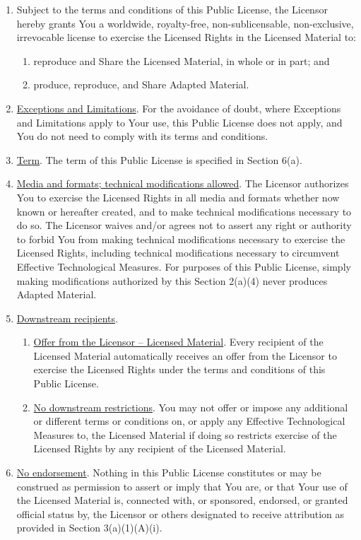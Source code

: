 \documentclass[a4paper, 12pt]{article}
\begin{document}
\begin{enumerate}
\item Subject to the terms and conditions of this Public License, the Licensor hereby grants You a worldwide, royalty-free, non-sublicensable, non-exclusive, irrevocable license to exercise the Licensed Rights in the Licensed Material to:
\begin{enumerate}[label=\Alph*.]
\item reproduce and Share the Licensed Material, in whole or in part; and
\item produce, reproduce, and Share Adapted Material.
\end{enumerate}
\item \underline{Exceptions and Limitations}. For the avoidance of doubt, where Exceptions and Limitations apply to Your use, this Public License does not apply, and You do not need to comply with its terms and conditions.
\item \underline{Term}. The term of this Public License is specified in Section 6(a).
\item \underline{Media and formats; technical modifications allowed}. The Licensor authorizes You to exercise the Licensed Rights in all media and formats whether now known or hereafter created, and to make technical modifications necessary to do so. The Licensor waives and/or agrees not to assert any right or authority to forbid You from making technical modifications necessary to exercise the Licensed Rights, including technical modifications necessary to circumvent Effective Technological Measures. For purposes of this Public License, simply making modifications authorized by this Section 2(a)(4) never produces Adapted Material.
\item \underline{Downstream recipients}.
\begin{enumerate}[label=\Alph*.]
\item \underline{Offer from the Licensor – Licensed Material}. Every recipient of the Licensed Material automatically receives an offer from the Licensor to exercise the Licensed Rights under the terms and conditions of this Public License.
\item \underline{No downstream restrictions}. You may not offer or impose any additional or different terms or conditions on, or apply any Effective Technological Measures to, the Licensed Material if doing so restricts exercise of the Licensed Rights by any recipient of the Licensed Material.
\end{enumerate}
\item \underline{No endorsement}. Nothing in this Public License constitutes or may be construed as permission to assert or imply that You are, or that Your use of the Licensed Material is, connected with, or sponsored, endorsed, or granted official status by, the Licensor or others designated to receive attribution as provided in Section 3(a)(1)(A)(i).

\end{enumerate}
\end{document}
